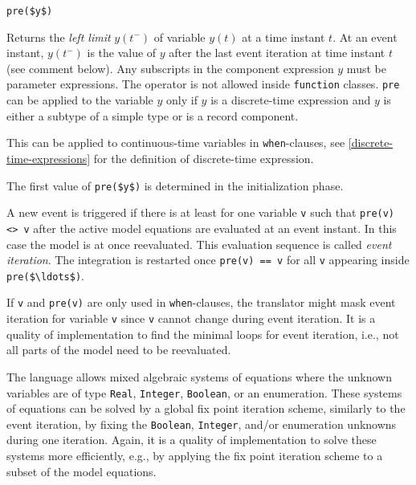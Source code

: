 \begin{operatordefinition}[pre]
\begin{synopsis}\begin{lstlisting}
pre($y$)
\end{lstlisting}\end{synopsis}
\begin{semantics}
Returns the \emph{left limit} $y(t^{-})$ of variable $y(t)$ at a time instant $t$.
At an event instant, $y(t^{-})$ is the value of $y$ after the last event iteration at time instant $t$ (see comment below).
Any subscripts in the component expression $y$ must be parameter expressions.
The operator is not allowed inside \lstinline!function! classes.
\lstinline!pre! can be applied to the variable $y$ only if $y$ is a discrete-time expression and $y$ is either a subtype of a simple type or is a record component.
\begin{nonnormative}
This can be applied to continuous-time variables in \lstinline!when!-clauses, see \cref{discrete-time-expressions} for the definition of discrete-time expression.
\end{nonnormative}
The first value of \lstinline!pre($y$)! is determined in the initialization phase.

A new event is triggered if there is at least for one variable \lstinline!v! such that \lstinline!pre(v) <> v! after the active model equations are evaluated at an event instant.
In this case the model is at once reevaluated.
This evaluation sequence is called \emph{event iteration}.
The integration is restarted once \lstinline!pre(v) == v! for all \lstinline!v! appearing inside \lstinline!pre($\ldots$)!.

\begin{nonnormative}
If \lstinline!v! and \lstinline!pre(v)! are only used in \lstinline!when!-clauses, the translator might mask event iteration for variable \lstinline!v! since \lstinline!v! cannot change during event iteration.
It is a quality of implementation to find the minimal loops for event iteration, i.e., not all parts of the model need to be reevaluated.

The language allows mixed algebraic systems of equations where the unknown variables are of type \lstinline!Real!, \lstinline!Integer!, \lstinline!Boolean!, or an enumeration.
These systems of equations can be solved by a global fix point iteration scheme, similarly to the event iteration, by fixing the \lstinline!Boolean!, \lstinline!Integer!, and/or enumeration unknowns during one iteration.
Again, it is a quality of implementation to solve these systems more efficiently, e.g., by applying the fix point iteration scheme to a subset of the model equations.
\end{nonnormative}
\end{semantics}
\end{operatordefinition}

